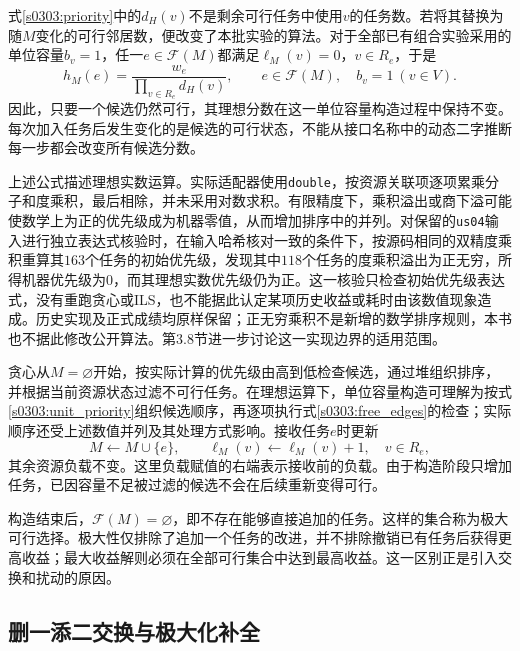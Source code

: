式\eqref{s0303:priority}中的$d_H(v)$不是剩余可行任务中使用$v$的任务数。若将其替换为随$M$变化的可行邻居数，便改变了本批实验的算法。对于全部已有组合实验采用的单位容量$b_v=1$，任一$e\in\mathcal{F}(M)$都满足$\ell_M(v)=0$，$v\in R_e$，于是
\begin{equation}
 h_M(e)=\frac{w_e}{\displaystyle\prod_{v\in R_e}d_H(v)},
 \qquad e\in\mathcal{F}(M),\quad b_v=1\ (v\in V).
 \label{s0303:unit_priority}
\end{equation}
因此，只要一个候选仍然可行，其理想分数在这一单位容量构造过程中保持不变。每次加入任务后发生变化的是候选的可行状态，不能从接口名称中的动态二字推断每一步都会改变所有候选分数。

上述公式描述理想实数运算。实际适配器使用\texttt{double}，按资源关联项逐项累乘分子和度乘积，最后相除，并未采用对数求积。有限精度下，乘积溢出或商下溢可能使数学上为正的优先级成为机器零值，从而增加排序中的并列。对保留的\texttt{us04}输入进行独立表达式核验时，在输入哈希核对一致的条件下，按源码相同的双精度乘积重算其$163$个任务的初始优先级，发现其中$118$个任务的度乘积溢出为正无穷，所得机器优先级为$0$，而其理想实数优先级仍为正。这一核验只检查初始优先级表达式，没有重跑贪心或ILS，也不能据此认定某项历史收益或耗时由该数值现象造成。历史实现及正式成绩均原样保留；正无穷乘积不是新增的数学排序规则，本书也不据此修改公开算法。第3.8节进一步讨论这一实现边界的适用范围。

贪心从$M=\varnothing$开始，按实际计算的优先级由高到低检查候选，通过堆组织排序，并根据当前资源状态过滤不可行任务。在理想运算下，单位容量构造可理解为按式\eqref{s0303:unit_priority}组织候选顺序，再逐项执行式\eqref{s0303:free_edges}的检查；实际顺序还受上述数值并列及其处理方式影响。接收任务$e$时更新
\begin{equation}
 M\leftarrow M\cup\{e\},\qquad
 \ell_M(v)\leftarrow\ell_M(v)+1,
 \quad v\in R_e,
 \label{s0303:greedy_add}
\end{equation}
其余资源负载不变。这里负载赋值的右端表示接收前的负载。由于构造阶段只增加任务，已因容量不足被过滤的候选不会在后续重新变得可行。

构造结束后，$\mathcal{F}(M)=\varnothing$，即不存在能够直接追加的任务。这样的集合称为极大可行选择。极大性仅排除了追加一个任务的改进，并不排除撤销已有任务后获得更高收益；最大收益解则必须在全部可行集合中达到最高收益。这一区别正是引入交换和扰动的原因。

\subsection{删一添二交换与极大化补全}

